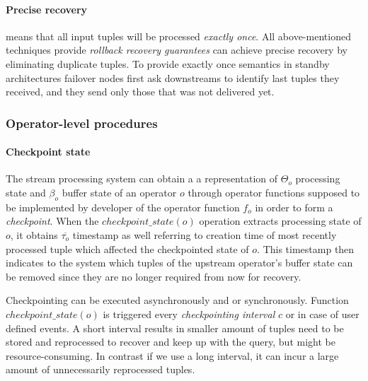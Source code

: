 \paragraph{Precise recovery} means that all input tuples will be processed \textit{exactly once}. All above-mentioned techniques provide \textit{rollback recovery guarantees} can achieve precise recovery by eliminating duplicate tuples. To provide exactly once semantics in standby architectures failover nodes first ask downstreams to identify last tuples they received, and they send only those that was not delivered yet.




\subsubsection{Operator-level procedures}
\paragraph{Checkpoint state} 
The stream processing system can obtain a a representation of $\Theta_o$ processing state and $\beta_o$ buffer state of an operator $o$ through operator functions supposed to be implemented by developer of the operator function $f_o$ in order to form a \textit{checkpoint}. When the $checkpoint\_state(o)$ operation extracts processing state of $o$, it obtains $\overline{\tau_o}$ timestamp as well referring to creation time of most recently processed tuple which affected the checkpointed state of $o$. This timestamp then indicates to the system which tuples of the upstream  operator's buffer state can be removed since they are no longer required from now for recovery.


Checkpointing can be executed asynchronously and or synchronously. %
Function $checkpoint\_state(o)$ is triggered every \textit{checkpointing interval} $c$ or in case of user defined events. A short interval results in smaller amount of tuples need to be stored and reprocessed to recover and keep up with the query, but might be resource-consuming. In contrast if we use a long interval, it can incur a large amount of unnecessarily reprocessed tuples. 

